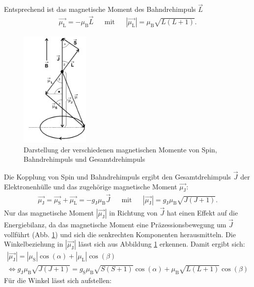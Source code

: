 Entsprechend ist das magnetische Moment des Bahndrehimpuls $\vec{L}$
\begin{align*}
  \vec{\mu_{\text{L}}} = - \mu_{\text{B}} \vec{L} && \text{mit} && |\vec{\mu_{\text{L}}}|= \mu_{\text{B}} \sqrt{L(L+1)}.
\end{align*}
\begin{figure}[h!]
  \centering
  \includegraphics[width=0.3\textwidth]{magmom1.png}
  \caption{Darstellung der verschiedenen magnetischen Momente von Spin, Bahndrehimpuls und Gesamtdrehimpuls \cite{1}}
  \label{fig:magmom}
\end{figure}
Die Kopplung von Spin und Bahndrehimpuls ergibt den Gesamtdrehimpuls $\vec{J}$ der Elektronenhülle und das zugehörige magnetische Moment $\vec{\mu_{\text{J}}}$:
\begin{align*}
  \vec{\mu_{\text{J}}} = \vec{\mu_{\text{S}}} + \vec{\mu_{\text{L}}}= - g_{\text{J}} \mu_{\text{B}} \vec{J} && \text{mit} && |\vec{\mu_{\text{J}}}|=  g_{\text{J}} \mu_{\text{B}} \sqrt{J(J+1)}.
\end{align*}
Nur das magnetische Moment $|\vec{\mu_{\text{J}}}|$ in Richtung von $\vec{J}$ hat einen Effekt auf die Energiebilanz, da das magnetische Moment eine Präzessionsbewegung um $\vec{J}$ vollführt (Abb. \ref{fig:magmom}) und sich die senkrechten Komponenten herausmitteln.
Die Winkelbeziehung in $|\vec{\mu_{\text{J}}}|$ lässt sich aus Abbildung \ref{fig:magmom} erkennen.
Damit ergibt sich:
\begin{align*}
                   |\vec{\mu_{\text{J}}}|                    =  |\mu_{\text{S}}| \cos{(\alpha)}                          + |\mu_{\text{L}}| \cos{(\beta)} \\
 \Leftrightarrow   g_{\text{J}} \mu_{\text{B}} \sqrt{J(J+1)} = g_{\text{S}} \mu_{\text{B}} \sqrt{S(S+1)} \cos{(\alpha)}  + \mu_{\text{B}} \sqrt{L(L+1)} \cos{(\beta)}
\end{align*}
Für die Winkel lässt sich aufstellen:

